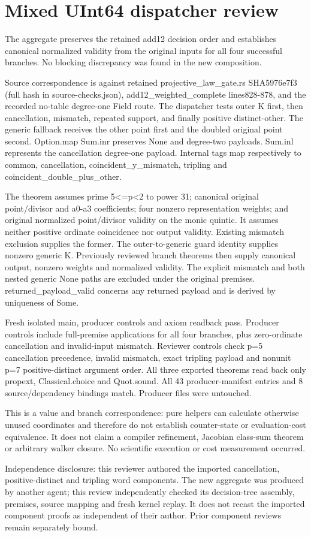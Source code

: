 \documentclass[10pt]{article}
\begin{document}
\section*{Mixed UInt64 dispatcher review}
The aggregate preserves the retained add12 decision order and establishes canonical normalized validity from the original inputs for all four successful branches. No blocking discrepancy was found in the new composition.

Source correspondence is against retained projective\_law\_gate.rs SHA5976e7f3 (full hash in source-checks.json), add12\_weighted\_complete lines828-878, and the recorded no-table degree-one Field route. The dispatcher tests outer K first, then cancellation, mismatch, repeated support, and finally positive distinct-other. The generic fallback receives the other point first and the doubled original point second. Option.map Sum.inr preserves None and degree-two payloads. Sum.inl represents the cancellation degree-one payload. Internal tags map respectively to common, cancellation, coincident\_y\_mismatch, tripling and coincident\_double\_plus\_other.

The theorem assumes prime 5\textless{}=p\textless{}2 to power 31; canonical original point/divisor and a0-a3 coefficients; four nonzero representation weights; and original normalized point/divisor validity on the monic quintic. It assumes neither positive ordinate coincidence nor output validity. Existing mismatch exclusion supplies the former. The outer-to-generic guard identity supplies nonzero generic K. Previously reviewed branch theorems then supply canonical output, nonzero weights and normalized validity. The explicit mismatch and both nested generic None paths are excluded under the original premises. returned\_payload\_valid concerns any returned payload and is derived by uniqueness of Some.

Fresh isolated main, producer controls and axiom readback pass. Producer controls include full-premise applications for all four branches, plus zero-ordinate cancellation and invalid-input mismatch. Reviewer controls check p=5 cancellation precedence, invalid mismatch, exact tripling payload and nonunit p=7 positive-distinct argument order. All three exported theorems read back only propext, Classical.choice and Quot.sound. All 43 producer-manifest entries and 8 source/dependency bindings match. Producer files were untouched.

This is a value and branch correspondence: pure helpers can calculate otherwise unused coordinates and therefore do not establish counter-state or evaluation-cost equivalence. It does not claim a compiler refinement, Jacobian class-sum theorem or arbitrary walker closure. No scientific execution or cost measurement occurred.

Independence disclosure: this reviewer authored the imported cancellation, positive-distinct and tripling word components. The new aggregate was produced by another agent; this review independently checked its decision-tree assembly, premises, source mapping and fresh kernel replay. It does not recast the imported component proofs as independent of their author. Prior component reviews remain separately bound.
\end{document}
